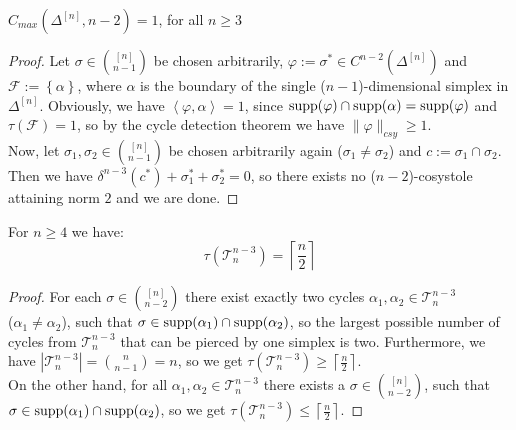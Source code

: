 \begin{thm}\label{theorem7}
\(C_{max}(\Delta^{[n]},n-2)=1\), for all \(n\geq 3\)
\begin{proof}
Let \(\sigma\in\binom{[n]}{n-1}\) be chosen arbitrarily, \(\varphi:=\sigma^*\in C^{n-2}(\Delta^{[n]})\) and\\
\(\mathcal{F}:=\left\{\alpha\right\}\), where \(\alpha\) is the boundary of the single (\(n-1\))-dimensional simplex in \(\Delta^{[n]}\). Obviously, we have \(\left\langle\varphi,\alpha\right\rangle=1\), since \(\mathrm{supp}(\varphi)\cap \mathrm{supp}(\alpha)=\mathrm{supp}(\varphi)\) and \(\tau(\mathcal{F})=1\), so by the cycle detection theorem we have \(\|\varphi\|_{csy}\geq 1\).\\
Now, let \(\sigma_1,\sigma_2\in\binom{[n]}{n-1}\) be chosen arbitrarily again (\(\sigma_1\neq\sigma_2\)) and \(c:=\sigma_1\cap\sigma_2\). Then we have \(\delta^{n-3}(c^*)+\sigma_1^*+\sigma_2^*=0\), so there exists no (\(n-2\))-cosystole attaining norm \(2\) and we are done.
\end{proof}
\end{thm}

\begin{lem}\label{lemma12}
For \(n\geq 4\) we have:
\[
\tau(\mathcal{T}_n^{n-3})=\left\lceil\frac{n}{2}\right\rceil
\]
\begin{proof}
For each \(\sigma\in\binom{[n]}{n-2}\) there exist exactly two cycles \(\alpha_1,\alpha_2\in\mathcal{T}_n^{n-3}\)\\
(\(\alpha_1\neq\alpha_2\)), such that \(\sigma\in \mathrm{supp}(\alpha_1)\cap \mathrm{supp}(\alpha_2)\), so the largest possible number of cycles from \(\mathcal{T}_n^{n-3}\) that can be pierced by one simplex is two. Furthermore, we have \(\left|\mathcal{T}_n^{n-3}\right|=\binom{n}{n-1}=n\), so we get \(\tau(\mathcal{T}_n^{n-3})\geq\left\lceil\frac{n}{2}\right\rceil\).\\
On the other hand, for all \(\alpha_1,\alpha_2\in\mathcal{T}_n^{n-3}\) there exists a \(\sigma\in\binom{[n]}{n-2}\), such that\\
\(\sigma\in \mathrm{supp}(\alpha_1)\cap \mathrm{supp}(\alpha_2)\), so we get \(\tau(\mathcal{T}_n^{n-3})\leq\left\lceil\frac{n}{2}\right\rceil\).
\end{proof}
\end{lem}

